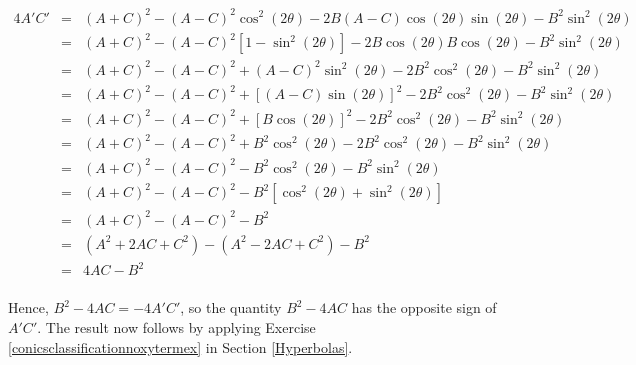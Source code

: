 \[ \begin{array}{rcl}

4A'C' & = & (A+C)^2 - (A-C)^2 \cos^{2}(2\theta) -2B(A-C)\cos(2\theta)\sin(2\theta) -B^2\sin^2(2\theta) \\ [3pt]
      & = & (A+C)^2 - (A-C)^2 \left[ 1-\sin^{2}(2\theta)\right] -2B\cos(2\theta) B \cos(2\theta) -B^2\sin^2(2\theta) \\ [3pt]
      & = & (A+C)^2 - (A-C)^2  + (A-C)^2 \sin^{2}(2\theta) -2B^2\cos^{2}(2\theta) -B^2\sin^2(2\theta) \\ [3pt]   
      & = & (A+C)^2 - (A-C)^2  +\left[(A-C) \sin(2\theta)\right]^2 -2B^2\cos^{2}(2\theta) -B^2\sin^2(2\theta)  \\ [3pt]    
      & = & (A+C)^2 - (A-C)^2  +\left[B \cos(2\theta)\right]^2 -2B^2\cos^{2}(2\theta) -B^2\sin^2(2\theta)  \\ [3pt]      
      & = & (A+C)^2 - (A-C)^2  +B^2\cos^{2}(2\theta) -2B^2\cos^{2}(2\theta) -B^2\sin^2(2\theta)  \\ [3pt]   
      & = & (A+C)^2 - (A-C)^2  -B^2\cos^{2}(2\theta) -B^2\sin^2(2\theta)  \\ [3pt] 
		  & = & (A+C)^2 - (A-C)^2  -B^2\left[\cos^{2}(2\theta)+ \sin^2(2\theta)\right]  \\ [3pt]  
		  & = & (A+C)^2 - (A-C)^2  -B^2  \\ [3pt] 
	  	& = & \left(A^2 + 2AC+C^2\right) - \left(A^2 - 2AC+C^2\right)  -B^2  \\ [3pt] 			    			
	  	& = & 4AC  -B^2  \\ [3pt] 		
\end{array} \]

Hence, $B^2 - 4AC = -4 A'C'$, so the quantity $B^2 - 4AC$ has the opposite sign of $A'C'$.  The result now follows by applying  Exercise \ref{conicsclassificationnoxytermex} in Section \ref{Hyperbolas}.

